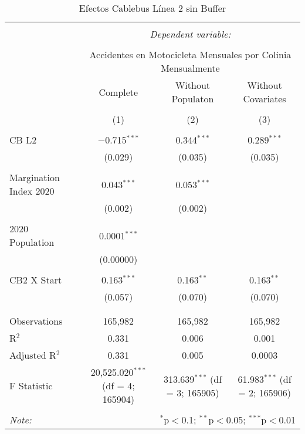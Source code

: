 
\begin{table}[!htbp] \centering 
  \caption{Efectos Cablebus Línea 2 sin Buffer} 
  \label{} 
\begin{tabular}{@{\extracolsep{5pt}}lccc} 
\\[-1.8ex]\hline 
\hline \\[-1.8ex] 
 & \multicolumn{3}{c}{\textit{Dependent variable:}} \\ 
\cline{2-4} 
\\[-1.8ex] & \multicolumn{3}{c}{Accidentes en Motocicleta Mensuales por Colinia Mensualmente} \\ 
 & Complete & Without Populaton & Without Covariates \\ 
\\[-1.8ex] & (1) & (2) & (3)\\ 
\hline \\[-1.8ex] 
 CB L2 & $-$0.715$^{***}$ & 0.344$^{***}$ & 0.289$^{***}$ \\ 
  & (0.029) & (0.035) & (0.035) \\ 
  & & & \\ 
 Margination Index 2020 & 0.043$^{***}$ & 0.053$^{***}$ &  \\ 
  & (0.002) & (0.002) &  \\ 
  & & & \\ 
 2020 Population & 0.0001$^{***}$ &  &  \\ 
  & (0.00000) &  &  \\ 
  & & & \\ 
 CB2 X Start & 0.163$^{***}$ & 0.163$^{**}$ & 0.163$^{**}$ \\ 
  & (0.057) & (0.070) & (0.070) \\ 
  & & & \\ 
\hline \\[-1.8ex] 
Observations & 165,982 & 165,982 & 165,982 \\ 
R$^{2}$ & 0.331 & 0.006 & 0.001 \\ 
Adjusted R$^{2}$ & 0.331 & 0.005 & 0.0003 \\ 
F Statistic & 20,525.020$^{***}$ (df = 4; 165904) & 313.639$^{***}$ (df = 3; 165905) & 61.983$^{***}$ (df = 2; 165906) \\ 
\hline 
\hline \\[-1.8ex] 
\textit{Note:}  & \multicolumn{3}{r}{$^{*}$p$<$0.1; $^{**}$p$<$0.05; $^{***}$p$<$0.01} \\ 
\end{tabular} 
\end{table} 
